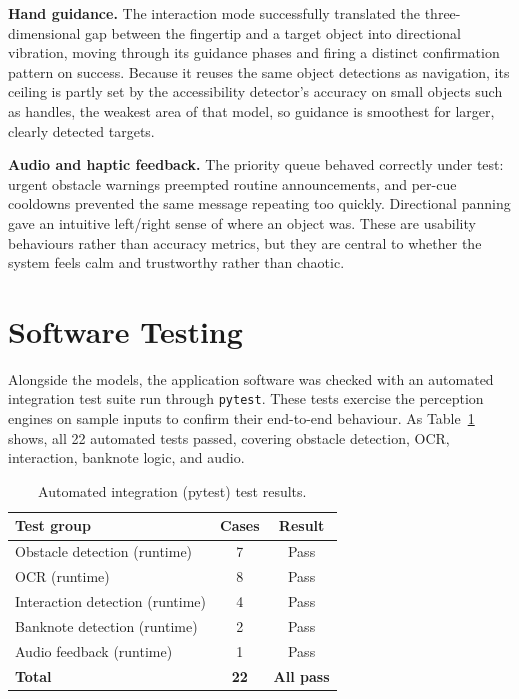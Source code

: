 \textbf{Hand guidance.} The interaction mode successfully translated the three-dimensional gap between the fingertip and a target object into directional vibration, moving through its guidance phases and firing a distinct confirmation pattern on success. Because it reuses the same object detections as navigation, its ceiling is partly set by the accessibility detector's accuracy on small objects such as handles, the weakest area of that model, so guidance is smoothest for larger, clearly detected targets.

\textbf{Audio and haptic feedback.} The priority queue behaved correctly under test: urgent obstacle warnings preempted routine announcements, and per-cue cooldowns prevented the same message repeating too quickly. Directional panning gave an intuitive left/right sense of where an object was. These are usability behaviours rather than accuracy metrics, but they are central to whether the system feels calm and trustworthy rather than chaotic.

\section{Software Testing}

Alongside the models, the application software was checked with an automated integration test suite run through \texttt{pytest}. These tests exercise the perception engines on sample inputs to confirm their end-to-end behaviour. As Table~\ref{tab:sw_tests} shows, all 22 automated tests passed, covering obstacle detection, OCR, interaction, banknote logic, and audio.

\begin{table}[H]
\centering
\caption{Automated integration (pytest) test results.}
\label{tab:sw_tests}
\begin{tabular}{lcc}
\toprule
\textbf{Test group} & \textbf{Cases} & \textbf{Result} \\
\midrule
Obstacle detection (runtime) & 7 & Pass \\
OCR (runtime) & 8 & Pass \\
Interaction detection (runtime) & 4 & Pass \\
Banknote detection (runtime) & 2 & Pass \\
Audio feedback (runtime) & 1 & Pass \\
\midrule
\textbf{Total} & \textbf{22} & \textbf{All pass} \\
\bottomrule
\end{tabular}
\end{table}

